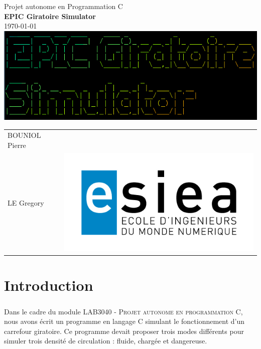 \documentclass[a4paper,12pt]{report}
\begin{document}
\begin{titlepage}
\begin{center}
{\Huge Projet autonome en Programmation C}\\[4ex] 
{\Huge \textbf{\textsc{EPIC} Giratoire Simulator}}\\[4ex] 
\today\\[8ex]
\includegraphics[scale=0.6]{logo2.png}\\[50ex]
\end{center}

\begin{tabular}{p{5cm} p{7cm}}
\vspace{0pt}
\textsc{BOUNIOL} Pierre\\\textsc{LE} Gregory
&
\vspace{0pt}
\hfill\includegraphics[scale=0.2]{Logo-ESIEA.jpg}
\end{tabular}

\end{titlepage}

\renewcommand{\contentsname}{Sommaire}

\tableofcontents
\newpage

\newpage
{}
\chapter*{Introduction}
\paragraph{}
Dans le cadre du module \textsc{LAB3040 - Projet autonome en programmation C}, nous avons écrit un programme en langage C simulant le fonctionnement d'un carrefour giratoire. Ce programme devait proposer trois modes différents pour simuler trois densité de circulation : fluide, chargée et dangereuse.
\end{document}
